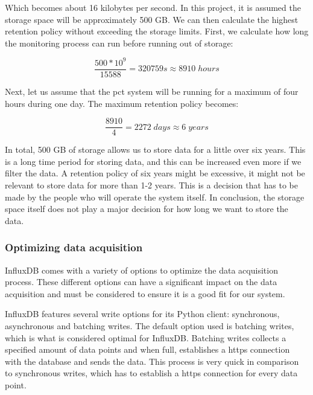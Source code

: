 \documentclass[main.tex]{subfiles}
\begin{document}
Which becomes about 16 kilobytes per second. In this project, it is assumed the storage space will be approximately 500 GB. We can then calculate the highest retention policy without exceeding the storage limits. First, we calculate how long the monitoring process can run before running out of storage:

\begin{equation} \label{eqn:total_bytes_total}
\frac{500 * 10^9}{15588} = 320759s \approx 8910\; hours
\end{equation}

Next, let us assume that the \gls{pct} system will be running for a maximum of four hours during one day. The maximum retention policy becomes:

\begin{equation} \label{eqn:total_retention}
\frac{8910}{4} = 2272\; days \approx 6\; years
\end{equation}

In total, 500 GB of storage allows us to store data for a little over six years. This is a long time period for storing data, and this can be increased even more if we filter the data. A retention policy of six years might be excessive, it might not be relevant to store data for more than 1-2 years. This is a decision that has to be made by the people who will operate the system itself. In conclusion, the storage space itself does not play a major decision for how long we want to store the data.



\subsubsection{Optimizing data acquisition}

InfluxDB comes with a variety of options to optimize the data acquisition process. These different options can have a significant impact on the data acquisition and must be considered to ensure it is a good fit for our system.

InfluxDB features several write options for its Python client: synchronous, asynchronous and batching writes. The default option used is batching writes, which is what is considered optimal for InfluxDB. Batching writes collects a specified amount of data points and when full, establishes a https connection with the database and sends the data. This process is very quick in comparison to synchronous writes, which has to establish a https connection for every data point.
\end{document}

